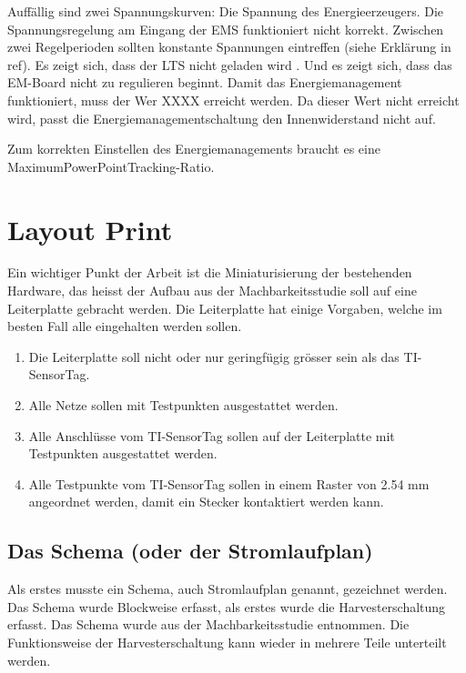 Auffällig sind zwei Spannungskurven: Die Spannung des Energieerzeugers. Die Spannungsregelung am Eingang der EMS funktioniert nicht korrekt. Zwischen zwei Regelperioden sollten konstante Spannungen eintreffen (siehe Erklärung in ref). 
Es zeigt sich, dass der LTS nicht geladen wird . Und es zeigt sich, dass das EM-Board nicht zu regulieren beginnt. Damit das Energiemanagement funktioniert, muss der Wer XXXX erreicht werden. Da dieser Wert nicht erreicht wird, passt die Energiemanagementschaltung den Innenwiderstand nicht auf.

Zum korrekten Einstellen des Energiemanagements braucht es eine MaximumPowerPointTracking-Ratio.




\section{Layout Print}

Ein wichtiger Punkt der Arbeit ist die Miniaturisierung der bestehenden Hardware, das heisst der Aufbau aus der Machbarkeitsstudie soll auf eine Leiterplatte gebracht werden. Die Leiterplatte hat einige Vorgaben, welche im besten Fall alle eingehalten werden sollen.

\begin{enumerate}
    \item Die Leiterplatte soll nicht oder nur geringfügig grösser sein als das TI-SensorTag.
    
    \item Alle Netze sollen mit Testpunkten ausgestattet werden.
    
    \item Alle Anschlüsse vom TI-SensorTag sollen auf der Leiterplatte mit Testpunkten ausgestattet werden.
    
    \item Alle Testpunkte vom TI-SensorTag sollen in einem Raster von 2.54 mm angeordnet werden, damit ein Stecker kontaktiert werden kann.
    
\end{enumerate}
	


\subsection{Das Schema (oder der Stromlaufplan)}
Als erstes musste ein Schema, auch Stromlaufplan genannt, gezeichnet werden. Das Schema wurde Blockweise erfasst, als erstes wurde die Harvesterschaltung erfasst. Das Schema wurde aus der Machbarkeitsstudie entnommen. Die Funktionsweise der Harvesterschaltung kann wieder in mehrere Teile unterteilt werden.


